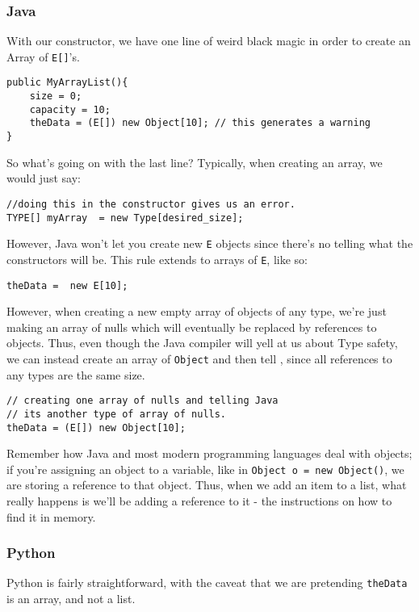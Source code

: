 \subsubsection{Java}
With our constructor, we have one line of weird black magic in order to create an Array of \texttt{E[]}'s.
\begin{verbatim}
public MyArrayList(){
	size = 0;
	capacity = 10;
	theData = (E[]) new Object[10]; // this generates a warning
}
\end{verbatim}

So what's going on with the last line?
Typically, when creating an array, we would just say:

\begin{verbatim}
//doing this in the constructor gives us an error.
TYPE[] myArray  = new Type[desired_size];
\end{verbatim}

However, Java won't let you create new \texttt{E} objects since there's no telling what the constructors will be.  This rule extends to arrays of \texttt{E}, like so:
\begin{verbatim}
theData =  new E[10];
\end{verbatim}

However, when creating a new empty array of objects of any type, we're just making an array of nulls which will eventually be replaced by references to objects.  Thus, even though the Java compiler will yell at us about Type safety, we can instead create an array of \texttt{Object} and then tell , since all references to any types are the same size.

\begin{verbatim}
// creating one array of nulls and telling Java 
// its another type of array of nulls. 
theData = (E[]) new Object[10];
\end{verbatim}



Remember how Java and most modern programming languages deal with objects; if you're assigning an object to a variable, like in \texttt{Object o = new Object()}, we are storing a reference to that object.
Thus, when we add an item to a list, what really happens is we'll be adding a reference to it - the instructions on how to find it in memory.


\subsubsection{Python}
Python is fairly straightforward, with the caveat that we are pretending \texttt{theData} is an array, and not a list.

